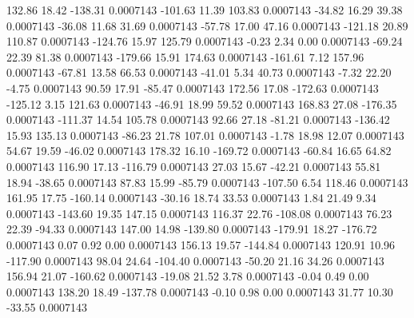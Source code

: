       132.86       18.42     -138.31     0.0007143
     -101.63       11.39      103.83     0.0007143
      -34.82       16.29       39.38     0.0007143
      -36.08       11.68       31.69     0.0007143
      -57.78       17.00       47.16     0.0007143
     -121.18       20.89      110.87     0.0007143
     -124.76       15.97      125.79     0.0007143
       -0.23        2.34        0.00     0.0007143
      -69.24       22.39       81.38     0.0007143
     -179.66       15.91      174.63     0.0007143
     -161.61        7.12      157.96     0.0007143
      -67.81       13.58       66.53     0.0007143
      -41.01        5.34       40.73     0.0007143
       -7.32       22.20       -4.75     0.0007143
       90.59       17.91      -85.47     0.0007143
      172.56       17.08     -172.63     0.0007143
     -125.12        3.15      121.63     0.0007143
      -46.91       18.99       59.52     0.0007143
      168.83       27.08     -176.35     0.0007143
     -111.37       14.54      105.78     0.0007143
       92.66       27.18      -81.21     0.0007143
     -136.42       15.93      135.13     0.0007143
      -86.23       21.78      107.01     0.0007143
       -1.78       18.98       12.07     0.0007143
       54.67       19.59      -46.02     0.0007143
      178.32       16.10     -169.72     0.0007143
      -60.84       16.65       64.82     0.0007143
      116.90       17.13     -116.79     0.0007143
       27.03       15.67      -42.21     0.0007143
       55.81       18.94      -38.65     0.0007143
       87.83       15.99      -85.79     0.0007143
     -107.50        6.54      118.46     0.0007143
      161.95       17.75     -160.14     0.0007143
      -30.16       18.74       33.53     0.0007143
        1.84       21.49        9.34     0.0007143
     -143.60       19.35      147.15     0.0007143
      116.37       22.76     -108.08     0.0007143
       76.23       22.39      -94.33     0.0007143
      147.00       14.98     -139.80     0.0007143
     -179.91       18.27     -176.72     0.0007143
        0.07        0.92        0.00     0.0007143
      156.13       19.57     -144.84     0.0007143
      120.91       10.96     -117.90     0.0007143
       98.04       24.64     -104.40     0.0007143
      -50.20       21.16       34.26     0.0007143
      156.94       21.07     -160.62     0.0007143
      -19.08       21.52        3.78     0.0007143
       -0.04        0.49        0.00     0.0007143
      138.20       18.49     -137.78     0.0007143
       -0.10        0.98        0.00     0.0007143
       31.77       10.30      -33.55     0.0007143
